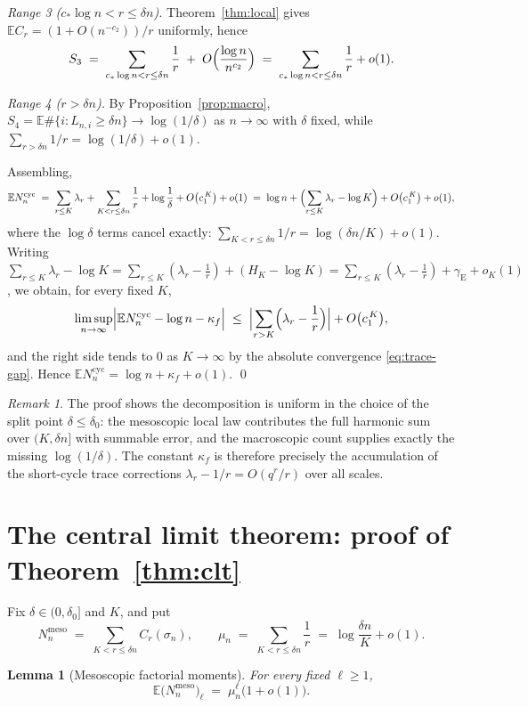 \documentclass[11pt]{article}
\newcommand{\E}{\mathbb{E}}
\newcommand{\1}{\mathbf{1}}
\newcommand{\cyc}{\mathrm{cyc}}
\newcommand{\gE}{\gamma_{\mathrm{E}}}
\newtheorem{lemma}[theorem]{Lemma}
\theoremstyle{remark}
\newtheorem{remark}[theorem]{Remark}
\begin{document}
\emph{Range 3 ($c_*\log n<r\le\delta n$).} Theorem~\ref{thm:local} gives
$\E C_r=(1+O(n^{-c_2}))/r$ uniformly, hence
\[
S_3\;=\;\sum_{c_*\log n<r\le\delta n}\frac1r
\;+\;O\Bigl(\frac{\log n}{n^{c_2}}\Bigr)
\;=\;\sum_{c_*\log n<r\le\delta n}\frac1r+o(1).
\]

\emph{Range 4 ($r>\delta n$).} By Proposition~\ref{prop:macro},
$S_4=\E\#\{i:L_{n,i}\ge\delta n\}\to\log(1/\delta)$ as $n\to\infty$ with
$\delta$ fixed, while
$\sum_{r>\delta n}1/r=\log(1/\delta)+o(1)$.

Assembling,
\[
\E N_n^{\cyc}
\;=\;\sum_{r\le K}\lambda_r+\sum_{K<r\le\delta n}\frac1r
+\log\frac1\delta+O\bigl(c_1^{\,K}\bigr)+o(1)
\;=\;\log n+\Bigl(\sum_{r\le K}\lambda_r-\log K\Bigr)
+O\bigl(c_1^{\,K}\bigr)+o(1),
\]
where the $\log\delta$ terms cancel exactly:
$\sum_{K<r\le\delta n}1/r=\log(\delta n/K)+o(1)$. Writing
$\sum_{r\le K}\lambda_r-\log K
=\sum_{r\le K}(\lambda_r-\frac1r)+(H_K-\log K)
=\sum_{r\le K}(\lambda_r-\frac1r)+\gE+o_K(1)$,
we obtain, for every fixed $K$,
\[
\limsup_{n\to\infty}\Bigl|\E N_n^{\cyc}-\log n-\kappa_f\Bigr|
\;\le\;\Bigl|\sum_{r>K}\Bigl(\lambda_r-\frac1r\Bigr)\Bigr|
+O\bigl(c_1^{\,K}\bigr),
\]
and the right side tends to $0$ as $K\to\infty$ by the absolute convergence
\eqref{eq:trace-gap}. Hence $\E N_n^{\cyc}=\log n+\kappa_f+o(1)$.
\qed

\begin{remark}\label{rem:uniform-in-delta}
The proof shows the decomposition is uniform in the choice of the split
point $\delta\le\delta_0$: the mesoscopic local law contributes the full
harmonic sum over $(K,\delta n]$ with summable error, and the macroscopic
count supplies exactly the missing $\log(1/\delta)$. The constant
$\kappa_f$ is therefore precisely the accumulation of the short-cycle trace
corrections $\lambda_r-1/r=O(q^r/r)$ over all scales.
\end{remark}

\section{The central limit theorem: proof of Theorem~\ref{thm:clt}}\label{sec:clt}

Fix $\delta\in(0,\delta_0]$ and $K$, and put
\[
N_n^{\mathrm{meso}}\;=\;\sum_{K<r\le\delta n}C_r(\sigma_n),
\qquad
\mu_n\;=\;\sum_{K<r\le\delta n}\frac1r
\;=\;\log\frac{\delta n}{K}+o(1).
\]

\begin{lemma}[Mesoscopic factorial moments]\label{lem:clt-fm}
For every fixed $\ell\ge1$,
\begin{equation}\label{eq:clt-fm}
\E\bigl(N_n^{\mathrm{meso}}\bigr)_\ell
\;=\;\mu_n^\ell\bigl(1+o(1)\bigr).
\end{equation}
\end{lemma}
\end{document}
